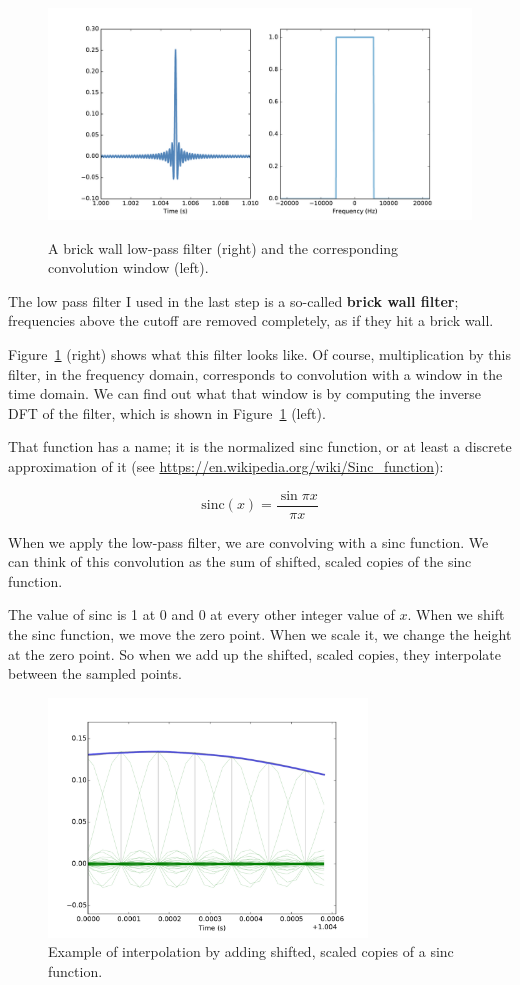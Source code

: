 \documentclass[12pt]{book}
\begin{document}
\begin{figure}
\centerline{\includegraphics[height=2.5in]{figs/sampling6.pdf}}
\caption{A brick wall low-pass filter (right) and the corresponding
convolution window (left).}
\label{fig.sampling6}
\end{figure}

The low pass filter I used in the last step is a so-called {\bf brick
  wall filter}; frequencies above the cutoff are removed completely,
as if they hit a brick wall.

Figure~\ref{fig.sampling6} (right) shows what this filter looks like.
Of course, multiplication by this filter, in the frequency domain,
corresponds to convolution with a window in the time domain.  We can
find out what that window is by computing the inverse DFT of the
filter, which is shown in Figure~\ref{fig.sampling6} (left).

That function has a name; it is the normalized sinc function, or at
least a discrete approximation of it (see
\url{https://en.wikipedia.org/wiki/Sinc_function}):

\[ \mathrm{sinc}(x) = \frac{\sin \pi x}{\pi x} \]

When we apply the low-pass filter, we are convolving with a sinc
function.  We can think of this convolution as the sum of shifted,
scaled copies of the sinc function.

The value of sinc is 1 at 0 and 0 at every other integer
value of $x$.  When we shift the sinc function, we move the zero point.
When we scale it, we change the height at the zero point.
So when we add up the shifted, scaled copies, they interpolate
between the sampled points.

\begin{figure}
\centerline{\includegraphics[height=2.5in]{figs/sampling8.pdf}}
\caption{Example of interpolation by adding shifted, scaled copies of a sinc function.}
\label{fig.sampling8}
\end{figure}
\end{document}
